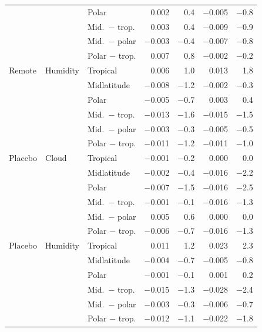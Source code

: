 \documentclass[11pt]{article}
\begin{document}
\begin{table}[htbp]
\begin{tabular}{@{}lllrrrr@{}}
 &  & Polar & 0.002 & 0.4 & $-$0.005 & $-$0.8 \\
 &  & Mid.\ $-$ trop. & 0.003 & 0.4 & $-$0.009 & $-$0.9 \\
 &  & Mid.\ $-$ polar & $-$0.003 & $-$0.4 & $-$0.007 & $-$0.8 \\
 &  & Polar $-$ trop. & 0.007 & 0.8 & $-$0.002 & $-$0.2 \\
\addlinespace[2pt]
Remote & Humidity & Tropical & 0.006 & 1.0 & 0.013 & 1.8 \\
 &  & Midlatitude & $-$0.008 & $-$1.2 & $-$0.002 & $-$0.3 \\
 &  & Polar & $-$0.005 & $-$0.7 & 0.003 & 0.4 \\
 &  & Mid.\ $-$ trop. & $-$0.013 & $-$1.6 & $-$0.015 & $-$1.5 \\
 &  & Mid.\ $-$ polar & $-$0.003 & $-$0.3 & $-$0.005 & $-$0.5 \\
 &  & Polar $-$ trop. & $-$0.011 & $-$1.2 & $-$0.011 & $-$1.0 \\
\addlinespace[2pt]
Placebo & Cloud & Tropical & $-$0.001 & $-$0.2 & 0.000 & 0.0 \\
 &  & Midlatitude & $-$0.002 & $-$0.4 & $-$0.016 & $-$2.2 \\
 &  & Polar & $-$0.007 & $-$1.5 & $-$0.016 & $-$2.5 \\
 &  & Mid.\ $-$ trop. & $-$0.001 & $-$0.1 & $-$0.016 & $-$1.3 \\
 &  & Mid.\ $-$ polar & 0.005 & 0.6 & 0.000 & 0.0 \\
 &  & Polar $-$ trop. & $-$0.006 & $-$0.7 & $-$0.016 & $-$1.3 \\
\addlinespace[2pt]
Placebo & Humidity & Tropical & 0.011 & 1.2 & 0.023 & 2.3 \\
 &  & Midlatitude & $-$0.004 & $-$0.7 & $-$0.005 & $-$0.8 \\
 &  & Polar & $-$0.001 & $-$0.1 & 0.001 & 0.2 \\
 &  & Mid.\ $-$ trop. & $-$0.015 & $-$1.3 & $-$0.028 & $-$2.4 \\
 &  & Mid.\ $-$ polar & $-$0.003 & $-$0.3 & $-$0.006 & $-$0.7 \\
 &  & Polar $-$ trop. & $-$0.012 & $-$1.1 & $-$0.022 & $-$1.8 \\
\bottomrule
\end{tabular}
\end{table}
\end{document}
